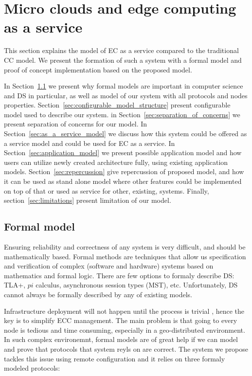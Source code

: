 \chapter{Micro clouds and edge computing as a service}\label{chapter:Micro_clouds}
%
This section explains the model of EC as a service compared to the traditional CC model. We present the formation of such a system with a formal model and proof of concept implementation based on the proposed model.

In Section~\ref{sec:formal_model} we present why formal models are important in computer science and DS in particular, as well as model of our system with all protocols and nodes properties. Section~\ref{sec:configurable_model_structure} present configurable model used to describe our system. in Section~\ref{sec:separation_of_concerns} we present separation of concerns for our model. In Section~\ref{sec:as_a_service_model} we discuss how this system could be offered as a service model and could be used for EC as a service. In Section~\ref{sec:application_model} we present possible application model and how users can utilize newly created architecture fully, using existing application models. Section~\ref{sec:repercussion} give repercussion of proposed model, and how it can be used as stand alone model where other features could be implemented on top of that or used as service for other, existing, systems. Finally, section~\ref{sec:limitations} present limitation of our model.
%
%
\section{Formal model}\label{sec:formal_model}
%
Ensuring reliability and correctness of any system is very difficult, and should be mathematically based. Formal methods are techniques that allow us specification and verification of complex (software and hardware) systems based on mathematics and formal logic. There are few options to formaly describe DS: TLA+, $pi$ calculus, asynchronous session types (MST), etc. Unfortunately, DS cannot always be formally described by any of existing models.

Infrastructure deployment will not happen until the process is trivial \cite{SatyanarayananBCD09}, hence the key is to simplify ECC management. The main problem is that going to every node is tedious and time consuming, especially in a geo-distributed environment. In such complex environemnt, formal models are of great help if we can model and prove that protocols that system reyls on are correct. The system we propose tackles this issue using remote configuration and it relies on three formaly modeled protocols: 

